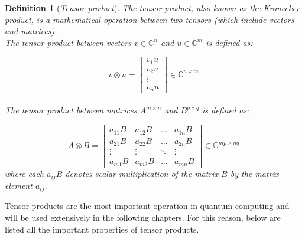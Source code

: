 \documentclass[12pt,a4paper]{report}
\newtheorem{definition}{Definition}
\begin{document}
\begin{definition}[\emph{Tensor product}]
The tensor product, also known as the Kronecker product, is a mathematical operation between two tensors (which include vectors and matrices).
\\

\noindent
\underline{The tensor product between vectors} \(v \in \mathbb{C}^{n}\) and \(u \in \mathbb{C}^{m}\) is defined as:

\begin{equation}
v \otimes u = 
\begin{bmatrix}
v_1 u \\
v_2 u \\
\vdots \\
v_n u
\end{bmatrix}
\in \mathbb{C}^{n \times m}
\end{equation}
\\

\noindent
\underline{The tensor product between matrices} \( A^{m\times n} \) and \( B^{p\times q} \) is defined as:

\begin{equation}
A \otimes B = 
\begin{bmatrix}
a_{11} B & a_{12} B & \dots & a_{1n} B \\
a_{21} B & a_{22} B & \dots & a_{2n} B \\
\vdots & \vdots & \ddots & \vdots \\
a_{m1} B & a_{m2} B & \dots & a_{mn} B 
\end{bmatrix}
\in \mathbb{C}^{mp \times nq}
\end{equation}
\noindent
where each \( a_{ij} B \) denotes scalar multiplication of the matrix \( B \) by the matrix element \( a_{ij} \).

\end{definition}

\noindent
Tensor products are the most important operation in quantum computing and will be used extensively in the following chapters. For this reason, below are listed all the important properties of tensor products.
\end{document}
